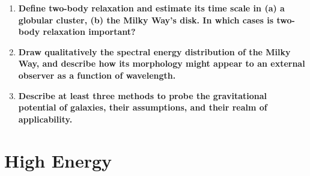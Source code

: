 \documentclass[12pt, letterpaper, preprint]{aastex}
\begin{document}
\begin{enumerate}

\item \textbf{Define two-body relaxation and estimate its time scale in (a) a globular cluster, (b) the Milky Way's disk. In which cases is two-body relaxation important?}

\item \textbf{Draw qualitatively the spectral energy distribution of the Milky Way, and describe how its morphology might appear to an external observer as a function of wavelength.}

\item \textbf{Describe at least three methods to probe the gravitational potential of galaxies, their assumptions, and their realm of applicability.}

\end{enumerate}

\section*{High Energy}
\end{document}
